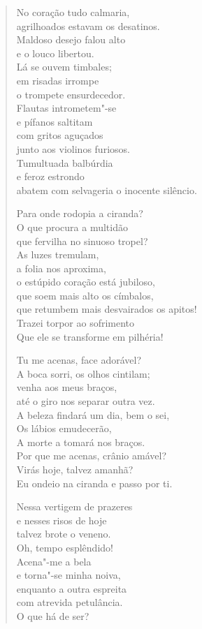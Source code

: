 \begin{verse}
No coração tudo calmaria,\\
agrilhoados estavam os desatinos.\\
Maldoso desejo falou alto\\
e o louco libertou.\\
Lá se ouvem timbales;\\
em risadas irrompe\\
o trompete ensurdecedor.\\
Flautas intrometem"-se\\
e pífanos saltitam\\
com gritos aguçados\\
junto aos violinos furiosos.\\
Tumultuada balbúrdia\\
e feroz estrondo\\
abatem com selvageria o inocente silêncio. 
 
Para onde rodopia a ciranda?\\
O que procura a multidão \\
que fervilha no sinuoso tropel?\\
As luzes tremulam,\\
a folia nos aproxima,\\
o estúpido coração está jubiloso,\\
que soem mais alto os címbalos,\\
que retumbem mais desvairados os apitos!\\
Trazei torpor ao sofrimento\\
Que ele se transforme em pilhéria! 

Tu me acenas, face adorável?\\
A boca sorri, os olhos cintilam;\\
venha aos meus braços,\\
até o giro nos separar outra vez.\\
A beleza findará um dia, bem o sei,\\
Os lábios emudecerão,\\
A morte a tomará nos braços.\\
Por que me acenas, crânio amável?\\
Virás hoje, talvez amanhã?\\
Eu ondeio na ciranda e passo por ti.

Nessa vertigem de prazeres\\
e nesses risos de hoje\\
talvez brote o veneno.\\
Oh, tempo esplêndido!\\
Acena"-me a bela\\
e torna"-se minha noiva,\\
enquanto a outra espreita\\ 
com atrevida petulância.\\
O que há de ser?
 

\end{verse}
